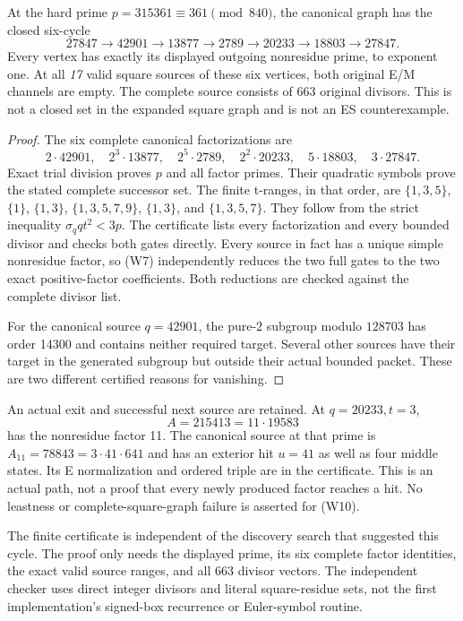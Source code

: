 \begin{theorem}\label{thm:six}
At the hard prime $p=315361\equiv361\pmod{840}$, the canonical graph has the
closed six-cycle
\[
 27847\to42901\to13877\to2789\to20233\to18803\to27847.    \tag{W10}
\]
Every vertex has exactly its displayed outgoing nonresidue prime, to exponent
one. At all \emph{17} valid square sources of these six vertices, both original
E/M channels are empty. The complete source consists of 663 original divisors.
This is not a closed set in the expanded square graph and is not an ES
counterexample.
\end{theorem}
\begin{proof}
The six complete canonical factorizations are
\[
 2\cdot42901,\quad2^3\cdot13877,\quad2^5\cdot2789,\quad
 2^2\cdot20233,\quad5\cdot18803,\quad3\cdot27847.
\]
Exact trial division proves $p$ and all factor primes. Their quadratic symbols
prove the stated complete successor set. The finite t-ranges, in that order,
are $\{1,3,5\}$, $\{1\}$, $\{1,3\}$, $\{1,3,5,7,9\}$, $\{1,3\}$, and $\{1,3,5,7\}$.
They follow from the strict inequality $\sigma_q qt^2<3p$. The certificate lists
every factorization and every bounded divisor and checks both gates directly.
Every source in fact has a unique simple nonresidue factor, so (W7) independently
reduces the two full gates to the two exact positive-factor coefficients.
Both reductions are checked against the complete divisor list.

For the canonical source $q=42901$, the pure-$2$ subgroup modulo $128703$
has order 14300 and contains neither required target. Several other sources
have their target in the generated subgroup but outside their actual bounded
packet. These are two different certified reasons for vanishing.
\end{proof}
An actual exit and successful next source are retained. At $q=20233,t=3$,
\[
 A=215413=11\cdot19583
\]
has the nonresidue factor 11. The canonical source at that prime is
$A_{11}=78843=3\cdot41\cdot641$ and has an exterior hit $u=41$ as well as
four middle states. Its E normalization and ordered triple are in the certificate.
This is an actual path, not a proof that every newly produced factor reaches a hit.
No leastness or complete-square-graph failure is asserted for (W10).

The finite certificate is independent of the discovery search that suggested
this cycle. The proof only needs the displayed prime, its six complete factor
identities, the exact valid source ranges, and all 663 divisor vectors. The
independent checker uses direct integer divisors and literal square-residue sets,
not the first implementation's signed-box recurrence or Euler-symbol routine.
